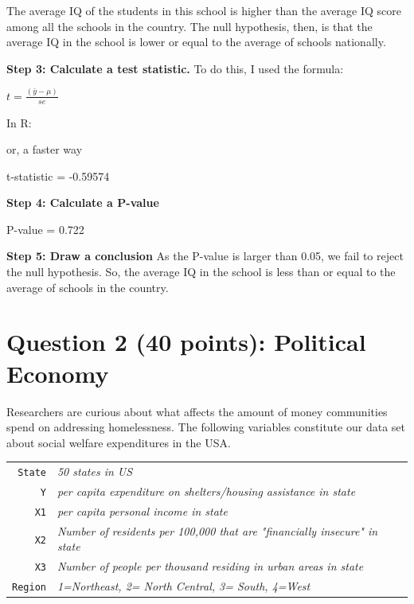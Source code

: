 \documentclass[12pt,letterpaper]{article}
\begin{document}
\begin{enumerate}
		The average IQ of the students in this school is higher than the average IQ score among all the schools in the country. The null hypothesis, then, is that the average IQ in the school is lower or equal to the average of schools nationally.
		
		\textbf{Step 3: Calculate a test statistic.}
		To do this, I used the formula:
	\begin{center}
		\large	$t=\frac{(\bar{y}-\mu)}{se}$
	\end{center}

		\normalsize In R:
		
		
		or, a faster way
	
		
		
		t-statistic = -0.59574
		
		\textbf{Step 4: Calculate a P-value}
		
		
		
		P-value = 0.722
		
		\textbf{Step 5: Draw a conclusion}
		As the P-value is larger than 0.05, we fail to reject the null hypothesis. So, the average IQ in the school is less than or equal to the average of schools in the country.
		
		
		
\end{enumerate}

\newpage

	\section*{Question 2 (40 points): Political Economy}

\noindent Researchers are curious about what affects the amount of money communities spend on addressing homelessness. The following variables constitute our data set about social welfare expenditures in the USA. \\
\vspace{.5cm}


\begin{tabular}{r|l}
	\texttt{State} &\emph{50 states in US} \\
	\texttt{Y} & \emph{per capita expenditure on shelters/housing assistance in state}\\
	\texttt{X1} &\emph{per capita personal income in state} \\
	\texttt{X2} &  \emph{Number of residents per 100,000 that are "financially insecure" in state}\\
	\texttt{X3} &  \emph{Number of people per thousand residing in urban areas in state} \\
	\texttt{Region} &  \emph{1=Northeast, 2= North Central, 3= South, 4=West} \\
\end{tabular}
\end{document}
